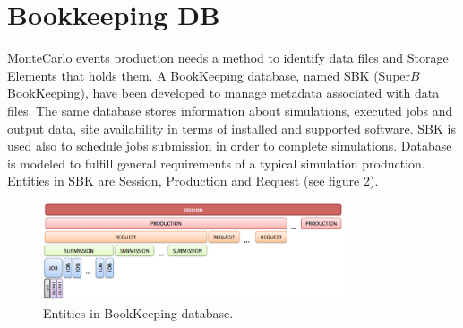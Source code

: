 \documentclass[journal]{IEEEtran}
\begin{document}
%

\section{Bookkeeping DB}
\label{sec:sbk}

MonteCarlo events production needs a method to identify data files and Storage Elements that holds them. 
A BookKeeping database, named SBK (Super$B$ BookKeeping), have been developed to manage metadata associated with data files. The same database stores information about simulations, executed jobs and output data, site availability in terms of installed and supported software. SBK is used also to schedule jobs submission in order to complete simulations. Database is modeled to fulfill general requirements of a typical simulation production.\\
Entities in SBK are Session, Production and Request (see figure 2).

\begin{figure}[!h]
\centering
\includegraphics[width=3.5in]{BK_entities.eps}
\caption{Entities in BookKeeping database.}
\label{fig:BK_entities}
\end{figure}
\end{document}
